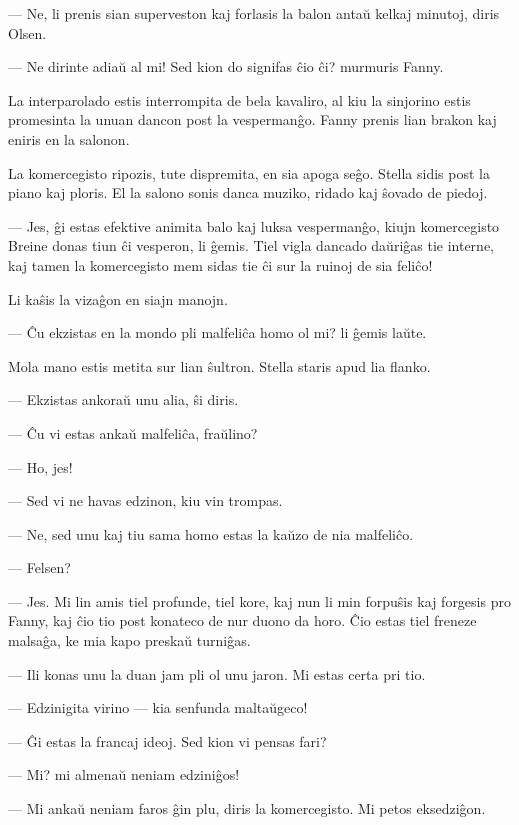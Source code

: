  --- Ne, li prenis sian superveston kaj forlasis la balon anta\u u kelkaj
minutoj, diris Olsen.

 --- Ne dirinte adia\u u al mi! Sed kion do signifas \^cio \^ci? murmuris
Fanny.

   La interparolado estis interrompita de bela kavaliro, al kiu la
sinjorino estis promesinta la unuan dancon post la vesperman\^go.
Fanny prenis lian brakon kaj eniris en la salonon.

   La komercegisto ripozis, tute dispremita, en sia apoga se\^go. Stella
sidis post la piano kaj ploris. El la salono sonis danca muziko,
ridado kaj \^sovado de piedoj.

 --- Jes, \^gi estas efektive animita balo kaj luksa vesperman\^go, kiujn
ko\-mer\-ce\-gis\-to Breine donas tiun \^ci vesperon, li \^gemis.
Tiel vigla dancado da\u uri\^gas tie interne, kaj tamen la
komercegisto mem sidas tie \^ci sur la ruinoj de sia feli\^co!

   Li ka\^sis la viza\^gon en siajn manojn.

 --- \^Cu ekzistas en la mondo pli malfeli\^ca homo ol mi? li \^gemis
la\u ute.

   Mola mano estis metita sur lian \^sultron. Stella staris apud lia
flanko.

 --- Ekzistas ankora\u u unu alia, \^si diris.

 --- \^Cu vi estas anka\u u malfeli\^ca, fra\u ulino?

 --- Ho, jes!

 --- Sed vi ne havas edzinon, kiu vin trompas.

 --- Ne, sed unu kaj tiu sama homo estas la ka\u uzo de nia malfeli\^co.

 --- Felsen?

 --- Jes. Mi lin amis tiel profunde, tiel kore, kaj nun li min
forpu\^sis kaj forgesis pro Fanny, kaj \^cio tio post konateco de
nur duono da horo. \^Cio estas tiel freneze malsa\^ga, ke mia kapo
preska\u u turni\^gas.

 --- Ili konas unu la duan jam pli ol unu jaron. Mi estas certa pri
tio.

 --- Edzinigita virino --- kia senfunda malta\u ugeco!

 --- \^Gi estas la francaj ideoj. Sed kion vi pensas fari?

 --- Mi? mi almena\u u neniam edzini\^gos!

 --- Mi anka\u u neniam faros \^gin plu, diris la komercegisto. Mi petos
eks\-ed\-zi\-\^gon.

